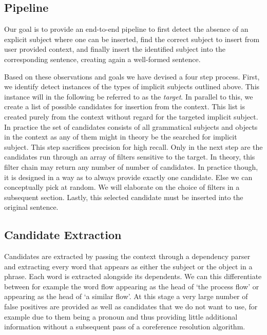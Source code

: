 \documentclass[times, 10pt,twocolumn]{article}
\begin{document}
\subsection{Pipeline}
Our goal is to provide an end-to-end pipeline to first detect the absence of an explicit subject where one
can be inserted, find the correct subject to insert from user provided context, and finally
insert the identified subject into the corresponding sentence, creating again a well-formed sentence. 

Based on these observations and goals we have devised a four step process. First, we identify detect
instances of the types of implicit subjects outlined above. This instance will in the following be 
referred to as the \textit{target}. In parallel to this, we create a list of possible
candidates for insertion from the context. This list is created purely from the context without regard
for the targeted implicit subject. In practice the set of candidates consists of all grammatical
subjects and objects in the context as any of them might in theory be the searched for implicit subject.
This step sacrifices precision for high recall.
Only in the next step are the candidates run through an array of filters sensitive to the target.
In theory, this filter chain may return any number of number of candidates. In practice though, it is
designed in a way as to always provide exactly one candidate. Else we can conceptually pick at random.
We will elaborate on the choice of filters in a subsequent section. %
Lastly, this selected candidate must be inserted into the original sentence.


\subsection{Candidate Extraction}
Candidates are extracted by passing the context through a dependency parser and extracting every word that
appears as either the subject or the object in a phrase. Each word is extracted alongside its dependents.
We can this differentiate between for example the word flow appearing as the head of `the process flow'
or appearing as the head of `a similar flow'. At this stage a very large number of false positives
are provided as well as candidates that we do not want to use, for example due to them being a pronoun
and thus providing little additional information without a subsequent pass of a coreference resolution
algorithm.
\end{document}
